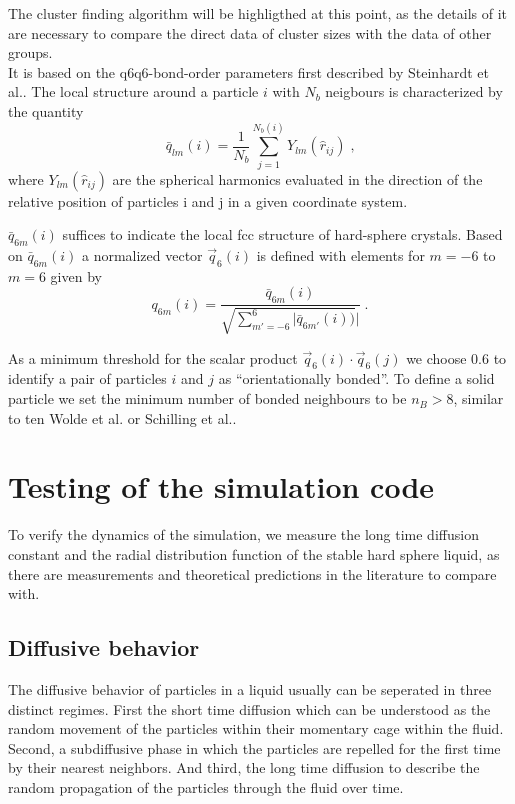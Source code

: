 The cluster finding algorithm will be highligthed at this point, as the details of it are necessary to compare the direct data of cluster sizes with the data of other groups.\\ 
It is based on the q6q6-bond-order parameters first described by Steinhardt et al.\cite{Steinhardt1983}.
The local structure around a particle $i$ with $N_b$ neigbours is characterized by the quantity
\begin{equation}
\label{eqn:local_q6}
\bar{q}_{lm}(i) = \frac{1}{N_b} \sum^{N_b (i)}_{j=1} Y_{lm} (\hat{r}_{ij}) \; \text{,}
\end{equation}
where $Y_{lm}(\hat{r}_{ij})$ are the spherical harmonics evaluated in the direction of the relative position of particles i and j in a given coordinate system.

$\bar{q}_{6m}(i)$ suffices to indicate the local fcc structure of hard-sphere crystals. Based on $\bar{q}_{6m}(i)$  a normalized vector $\vec{q}_{6}(i)$ is defined with elements for $m=-6$ to $m=6$ given by
\begin{equation}
q_{6m}(i) = \frac{\bar{q}_{6m}(i)}{ \sqrt{\sum_{m'=-6}^{6} |{\bar{q}_{6m'}(i)})}|  } \; \text{.}
\end{equation}

As a minimum threshold for the scalar product $\vec{q}_6(i) \cdot \vec{q}_6(j)$ we choose 0.6 to identify a pair of particles $i$ and $j$ as ``orientationally bonded''. To define a solid particle we set the minimum number of bonded neighbours to be $n_B > 8$, similar to ten Wolde et al.\cite{TenWolde1995} or Schilling et al.\cite{Schilling2011}.\\

\section{Testing of the simulation code}
\label{sec:probe}
To verify the dynamics of the simulation, we measure the long time diffusion constant and the radial distribution function of the stable hard sphere liquid, as there are measurements and theoretical predictions in the literature to compare with.

\subsection{Diffusive behavior}
\label{sec:diffusion_probe}
The diffusive behavior of particles in a liquid usually can be seperated in three distinct regimes. First the short time diffusion which can be understood as the random movement of the particles within their momentary cage within the fluid. Second, a subdiffusive phase in which the particles are repelled for the first time by their nearest neighbors. And third, the long time diffusion to describe the random propagation of the particles through the fluid over time.\\
   
